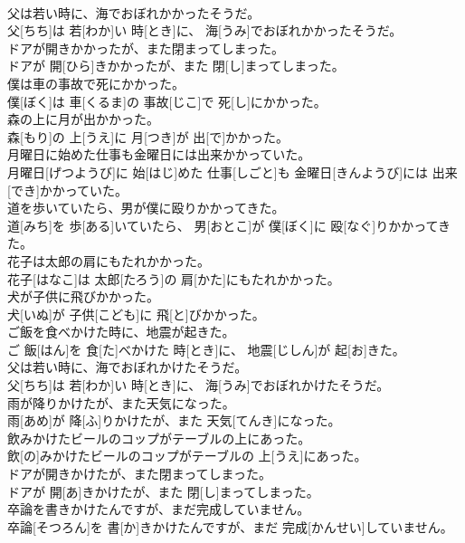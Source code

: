 \documentclass[8pt]{extreport}
\begin{document}
\begin{CJK}{UTF8}{min}
\\	父は若い時に、海でおぼれかかったそうだ。	
\\	父[ちち]は 若[わか]い 時[とき]に、 海[うみ]でおぼれかかったそうだ。
\\	ドアが開きかかったが、また閉まってしまった。	
\\	ドアが 開[ひら]きかかったが、また 閉[し]まってしまった。
\\	僕は車の事故で死にかかった。	
\\	僕[ぼく]は 車[くるま]の 事故[じこ]で 死[し]にかかった。
\\	森の上に月が出かかった。	
\\	森[もり]の 上[うえ]に 月[つき]が 出[で]かかった。
\\	月曜日に始めた仕事も金曜日には出来かかっていた。	
\\	月曜日[げつようび]に 始[はじ]めた 仕事[しごと]も 金曜日[きんようび]には 出来[でき]かかっていた。
\\	道を歩いていたら、男が僕に殴りかかってきた。	
\\	道[みち]を 歩[ある]いていたら、 男[おとこ]が 僕[ぼく]に 殴[なぐ]りかかってきた。
\\	花子は太郎の肩にもたれかかった。	
\\	花子[はなこ]は 太郎[たろう]の 肩[かた]にもたれかかった。
\\	犬が子供に飛びかかった。	
\\	犬[いぬ]が 子供[こども]に 飛[と]びかかった。
\\	ご飯を食べかけた時に、地震が起きた。	
\\	ご 飯[はん]を 食[た]べかけた 時[とき]に、 地震[じしん]が 起[お]きた。
\\	父は若い時に、海でおぼれかけたそうだ。	
\\	父[ちち]は 若[わか]い 時[とき]に、 海[うみ]でおぼれかけたそうだ。
\\	雨が降りかけたが、また天気になった。	
\\	雨[あめ]が 降[ふ]りかけたが、また 天気[てんき]になった。
\\	飲みかけたビールのコップがテーブルの上にあった。	
\\	飲[の]みかけたビールのコップがテーブルの 上[うえ]にあった。
\\	ドアが開きかけたが、また閉まってしまった。	
\\	ドアが 開[あ]きかけたが、また 閉[し]まってしまった。
\\	卒論を書きかけたんですが、まだ完成していません。	
\\	卒論[そつろん]を 書[か]きかけたんですが、まだ 完成[かんせい]していません。

\end{CJK}
\end{document}

